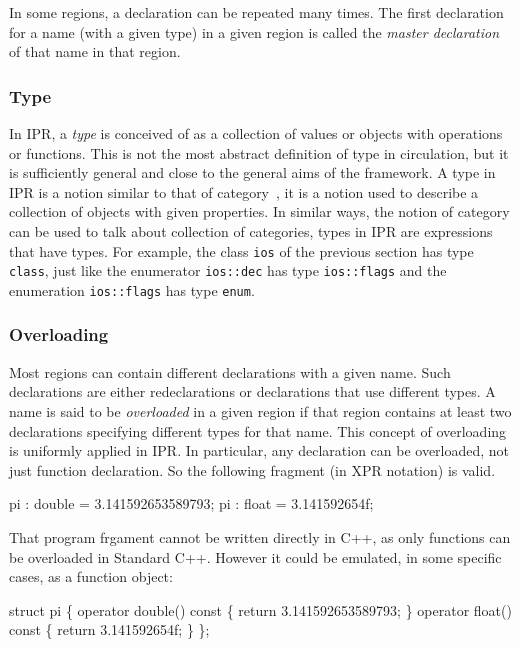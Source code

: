 \documentclass[a4paper,12pt]{article}
\begin{document}
In some regions, a declaration can be repeated many times. The first
 declaration for a name (with a given type) in a given region is 
 called the \emph{master declaration} of that name in that region.

\subsubsection{Type}
\label{sec:intro:general-notion:type}

In IPR, a \emph{type} is conceived of as a collection of values or objects
with operations or functions.  This is not the most abstract definition of
type in circulation, but it is sufficiently general and close to the 
general aims of the \ThePivot{} framework.  A type in IPR is a notion similar
to that of category~\cite{mac-lane01:categories}, it is a notion used to
describe a collection of objects with given properties.  In similar ways, the
notion of category can be used to talk about collection of categories, types 
in IPR are expressions that have types.  For example, the class \texttt{ios}
of the previous section has type \texttt{class}, just like
the enumerator \texttt{ios::dec} has type \texttt{ios::flags} and the
enumeration \texttt{ios::flags} has type \texttt{enum}.

\subsubsection{Overloading}
\label{sec:intro:general-notion:overloading}
Most regions can contain different declarations with a given name.  Such
declarations are either redeclarations or declarations that use
different types.  A name is said to be  \emph{overloaded} in a given region if
that region contains at least two declarations specifying different types for
that name.  This concept of overloading is uniformly applied in IPR.  In
particular, any declaration can be overloaded, not just function declaration.
So the following fragment (in XPR notation) is valid.
\begin{Program}
  pi : double = 3.141592653589793;
  pi : float = 3.141592654f;
\end{Program}

That program frgament cannot be written directly in C++, as only functions
can be overloaded in Standard C++.  However it could be emulated, in
some specific cases, as a function object:
\begin{Program}
  struct pi \{
    operator double() const \{ return 3.141592653589793; \}
    operator float() const \{ return 3.141592654f; \}
  \};
\end{Program}
\end{document}
